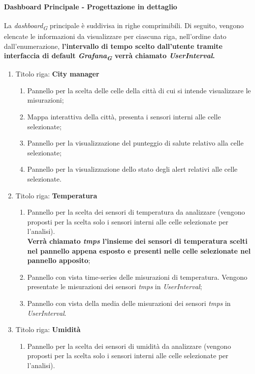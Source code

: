 \paragraph*{Dashboard Principale - Progettazione in dettaglio}
La \textit{dashboard}\textsubscript{\textit{G}} principale è suddivisa in righe comprimibili. Di seguito, vengono elencate le informazioni da visualizzare per ciascuna riga, nell’ordine dato dall'enumerazione, \textbf{ l'intervallo di tempo scelto dall'utente tramite interfaccia di default \textit{Grafana}\textsubscript{\textit{G}} verrà chiamato \textit{UserInterval}.}
\begin{enumerate}
    \item Titolo riga: \textbf{City manager}
    \begin{enumerate}
        \item Pannello per la scelta delle celle della città di cui si intende visualizzare le misurazioni;
        \item Mappa interattiva della città, presenta i sensori interni alle celle selezionate;
        \item Pannello per la visualizzazione del punteggio di salute relativo alla celle selezionate;
        \item Pannello per la visualizzazione dello stato degli alert relativi alle celle selezionate.
    \end{enumerate}
    \item Titolo riga: \textbf{Temperatura}
    \begin{enumerate}
        \item Pannello per la scelta dei sensori di temperatura da analizzare (vengono proposti per la scelta solo i sensori interni alle celle selezionate per l'analisi).\\
        \textbf{Verrà chiamato \textit{tmps} l'insieme dei sensori di temperatura scelti nel pannello appena esposto e presenti nelle celle selezionate nel pannello apposito};
        \item Pannello con vista time-series delle misurazioni di temperatura. Vengono presentate le misurazioni dei sensori \textit{tmps} in \textit{UserInterval};
        \item Pannello con vista della media delle misurazioni dei sensori \textit{tmps} in \textit{UserInterval}.
    \end{enumerate}
    \item Titolo riga: \textbf{Umidità}
    \begin{enumerate}
        \item Pannello per la scelta dei sensori di umidità da analizzare (vengono proposti per la scelta solo i sensori interni alle celle selezionate per l'analisi).\\

\end{enumerate}
\end{enumerate}
